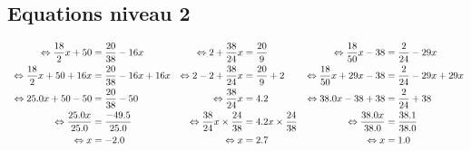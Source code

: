 \documentclass{article}%
\begin{document}
\subsection*{Equations niveau 2}%
\label{subsec:Equationsniveau2}%
\begin{align*}%
\  \Leftrightarrow \frac{18}{2}x + 50 &= \frac{20}{38} - 16x       &     \Leftrightarrow 2 + \frac{38}{24}x &= \frac{20}{9}     &     \Leftrightarrow  \frac{18}{50}x - 38 &= \frac{2}{24} - 29x\\%
\vspace{5mm}%
\newline%
\  \Leftrightarrow \frac{18}{2}x + 50 + 16x  &= \frac{20}{38} - 16x +16x    &    \Leftrightarrow 2 - 2 + \frac{38}{24}x &= \frac{20}{9} + 2      &     \Leftrightarrow  \frac{18}{50}x +29x - 38 &= \frac{2}{24} - 29x  + 29x\\%
\vspace{5mm}%
\newline%
\  \Leftrightarrow 25.0x + 50 - 50 &= \frac{20}{38}	- 50       &      \Leftrightarrow \frac{38}{24}x &= 4.2     &   \Leftrightarrow  38.0x - 38 +38 &= \frac{2}{24} + 38\\%
\vspace{5mm}%
\newline%
\  \Leftrightarrow \frac{25.0x}{25.0} &= \frac{-49.5}{25.0}     &      \Leftrightarrow \frac{38}{24}x \times \frac{24}{38} &= 4.2 x \times \frac{24}{38}      &      \Leftrightarrow  \frac{38.0x}{38.0} &= \frac{38.1}{38.0}\\%
\vspace{5mm}%
\newline%
\  \Leftrightarrow x &= -2.0    &     \Leftrightarrow x &= 2.7     &     \Leftrightarrow  x &= 1.0\\%
\vspace{5mm}%
\newline%
\end{align*}

%
\end{document}
